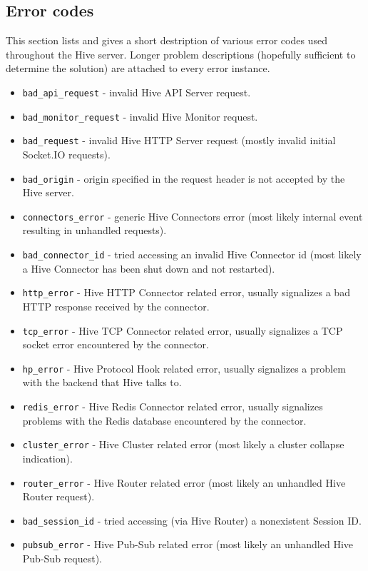 \documentclass[a4paper]{article}
\begin{document}
\subsection{Error codes}
\label{sec-5-3}

This section lists and gives a short destription of various error codes used throughout the Hive server. Longer problem descriptions (hopefully sufficient to determine the solution) are attached to every error instance.


\begin{itemize}
\item \texttt{bad\_api\_request} - invalid Hive API Server request.
\item \texttt{bad\_monitor\_request} - invalid Hive Monitor request.
\item \texttt{bad\_request} - invalid Hive HTTP Server request (mostly invalid initial Socket.IO requests).
\item \texttt{bad\_origin} - origin specified in the request header is not accepted by the Hive server.
\item \texttt{connectors\_error} - generic Hive Connectors error (most likely internal event resulting in unhandled requests).
\item \texttt{bad\_connector\_id} - tried accessing an invalid Hive Connector id (most likely a Hive Connector has been shut down and not restarted).
\item \texttt{http\_error} - Hive HTTP Connector related error, usually signalizes a bad HTTP response received by the connector.
\item \texttt{tcp\_error} - Hive TCP Connector related error, usually signalizes a TCP socket error encountered by the connector.
\item \texttt{hp\_error} - Hive Protocol Hook related error, usually signalizes a problem with the backend that Hive talks to.
\item \texttt{redis\_error} - Hive Redis Connector related error, usually signalizes problems with the Redis database encountered by the connector.
\item \texttt{cluster\_error} - Hive Cluster related error (most likely a cluster collapse indication).
\item \texttt{router\_error} - Hive Router related error (most likely an unhandled Hive Router request).
\item \texttt{bad\_session\_id} - tried accessing (via Hive Router) a nonexistent Session ID.
\item \texttt{pubsub\_error} - Hive Pub-Sub related error (most likely an unhandled Hive Pub-Sub request).

\end{itemize}
\end{document}
